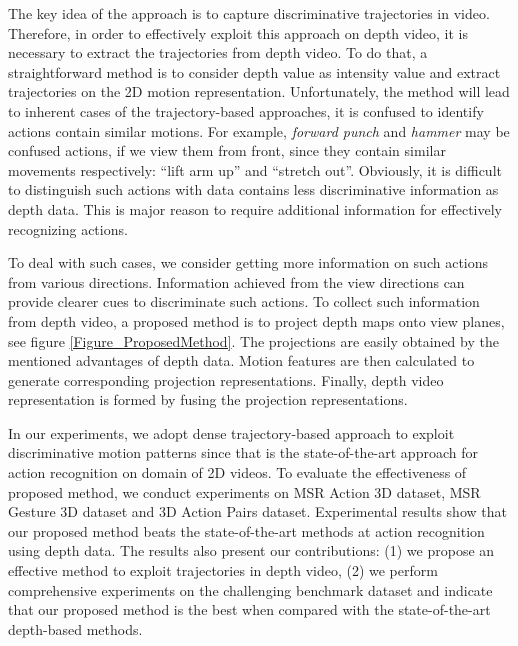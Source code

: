 \documentclass[final,3p,times,twocolumn]{elsarticle}
\begin{document}
The key idea of the approach is to capture discriminative trajectories in video.
Therefore, in order to effectively exploit this approach on depth video, it is necessary to extract the trajectories from depth video.
To do that, a straightforward method is to consider depth value as intensity value and extract trajectories on the 2D motion representation.
Unfortunately, the method will lead to inherent cases of the trajectory-based approaches, it is confused to identify actions contain similar motions.
For example, \textit{forward punch} and \textit{hammer} may be confused actions, if we view them from front, since they contain similar movements respectively: ``lift arm up'' and ``stretch out''.
Obviously, it is difficult to distinguish such actions with data contains less discriminative information as depth data.
This is major reason to require additional information for effectively recognizing actions.

To deal with such cases, we consider getting more information on such actions from various directions.
Information achieved from the view directions can provide clearer cues to discriminate such actions.
To collect such information from depth video, a proposed method is to project depth maps onto view planes, see figure \ref{Figure_ProposedMethod}.
The projections are easily obtained by the mentioned advantages of depth data.
Motion features are then calculated to generate corresponding projection representations.
Finally, depth video representation is formed by fusing the projection representations.

In our experiments, we adopt dense trajectory-based approach \cite{wang2011densetraj} to exploit discriminative motion patterns since that is the state-of-the-art approach for action recognition on domain of 2D videos.
To evaluate the effectiveness of proposed method, we conduct experiments on MSR Action 3D dataset, MSR Gesture 3D dataset and 3D Action Pairs dataset.
Experimental results show that our proposed method beats the state-of-the-art methods at action recognition using depth data.
The results also present our contributions: (1) we propose an effective method to exploit trajectories in depth video, (2) we perform comprehensive experiments on the challenging benchmark dataset and indicate that our proposed method is the best when compared with the state-of-the-art depth-based methods.
\end{document}
